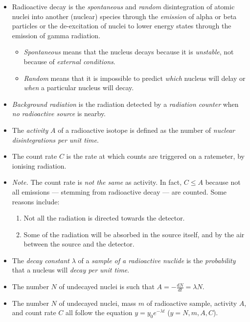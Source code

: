 \documentclass[oneside]{book}
\begin{document}
\begin{itemize}
    \item[\AsteriskThin] Radioactive decay is the \emph{spontaneous} and \emph{random} disintegration of atomic nuclei into another (nuclear) species through the \emph{emission} of alpha or beta particles or the de-excitation of nuclei to lower energy states through the emission of gamma radiation.
    \begin{itemize}
        \item \emph{Spontaneous} means that the nucleus decays because it is \emph{unstable}, not because of \emph{external conditions}.
        \item \emph{Random} means that it is impossible to predict \emph{which} nucleus will delay or \emph{when} a particular nucleus will decay.
    \end{itemize}
    \item[\AsteriskThin] \emph{Background radiation} is the radiation detected by a \emph{radiation counter} when \emph{no radioactive source} is nearby.
    \item[\AsteriskThin] The \emph{activity} \(A\) of a radioactive isotope is defined as the number of \emph{nuclear disintegrations per unit time}.
    \item The count rate \(C\) is the rate at which counts are triggered on a ratemeter, by ionising radiation. 
    \item \emph{Note.} The count rate is \emph{not the same} as activity. In fact, \(C\leq A\) because not all emissions --- stemming from radioactive decay --- are counted. Some reasons include:
    \begin{enumerate}
        \item Not all the radiation is directed towards the detector.
        \item Some of the radiation will be absorbed in the source itself, and by the air between the source and the detector. 
    \end{enumerate}
    \item[\AsteriskThin] The \emph{decay constant} \(\lambda\) of a \emph{sample of a radioactive nuclide} is the \emph{probability} that a nucleus will \emph{decay per unit time}. 
    \item The number \(N\) of undecayed nuclei is such that \(A=-\frac{dN}{dt}=\lambda N\).
    \item The number \(N\) of undecayed nuclei, mass \(m\) of radioactive sample, activity \(A\), and count rate \(C\) all follow the equation \(y=y_0e^{-\lambda t}\) (\(y=N,m,A,C\)).

\end{itemize}
\end{document}

